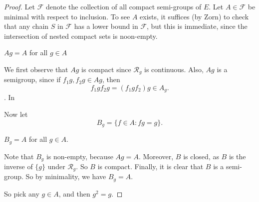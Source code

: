 \documentclass[a4paper]{article}
\begin{document}
\begin{proof}
  Let $\mathcal{F}$ denote the collection of all compact semi-groups of $E$. Let $A \in \mathcal{F}$ be minimal with respect to inclusion. To see $A$ exists, it suffices (by Zorn) to check that any chain $S$ in $\mathcal{F}$ has a lower bound in $\mathcal{F}$, but this is immediate, since the intersection of nested compact sets is noon-empty.

  \begin{claim}
    $Ag = A$ for all $g \in A$
  \end{claim}
  We first observe that $Ag$ is compact since $\mathcal{R}_g$ is continuous. Also, $Ag$ is a semigroup, since if $f_1 g, f_2 g \in Ag$, then
  \[
    f_1 g f_2 g = (f_1 g f_2) g\in A_g.
  \]
  . In

  Now let
  \[
    B_g = \{f \in A: fg = g\}.
  \]
  \begin{claim}
    $B_g = A$ for all $g \in A$.
  \end{claim}
  Note that $B_g$ is non-empty, because $Ag = A$. Moreover, $B$ is closed, as $B$ is the inverse of $\{g\}$ under $\mathcal{R}_g$. So $B$ is compact. Finally, it is clear that $B$ is a semi-group. So by minimality, we have $B_g = A$.

  So pick any $g \in A$, and then $g^2 = g$.
\end{proof}
\end{document}

